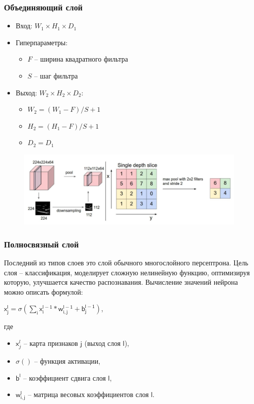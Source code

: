 \documentclass[unicode,9pt, pdf]{beamer}
\begin{document}
\begin{frame}
	\frametitle{Объединяющий слой}
		\begin{itemize}
			\item Вход: $W_{1} \times H_{1} \times D_{1}$
			\item Гиперпараметры: 
				\begin{itemize}
					\item $F$ -- ширина квадратного фильтра
					\item $S$ -- шаг фильтра
				\end{itemize}
			\item Выход: $W_{2} \times H_{2} \times D_{2}$:
				\begin{itemize}
					\item $W_{2} = (W_{1} - F)/S + 1$
					\item $H_{2} = (H_{1} - F)/S + 1$
					\item $D_{2} = D_{1}$
				\end{itemize}
		\end{itemize}
		\begin{figure}[h]
	\begin{center}
		\begin{minipage}[h]{0.92\linewidth}
			\includegraphics[width=1\linewidth]{cnn3.JPG}
		\end{minipage}
	\end{center}
\end{figure}
\end{frame}

\begin{frame}
	\frametitle{Полносвязный слой}
	Последний из типов слоев это слой обычного многослойного персептрона. Цель слоя – классификация, моделирует сложную нелинейную функцию, оптимизируя которую, улучшается качество распознавания. Вычисление значений нейрона можно описать формулой:
	\begin{center}
		$\mathsf{x}_{\mathsf{j}}^{\mathsf{l}} = \sigma(\sum \limits_{\mathsf{i}} \mathsf{x}_{\mathsf{i}}^{\mathsf{l-1}} * \mathsf{w}_{\mathsf{i,j}}^{\mathsf{l-1}}+\mathsf{b}_{\mathsf{j}}^{\mathsf{l-1}})$,
	\end{center}
	где
	\begin{itemize}
		\item $\mathsf{x}_{j}^{l}$ -- карта признаков $\mathsf{j}$ (выход слоя $\mathsf{l}$), 
		\item $\sigma()$ -- функция активации,
		\item $\mathsf{b}^{\mathsf{l}}$ -- коэффициент сдвига слоя $\mathsf{l}$,
		\item $\mathsf{w}_{\mathsf{i,j}}^{\mathsf{l}}$ -- матрица весовых коэффициентов слоя $\mathsf{l}$.
	\end{itemize}
\end{frame}
\end{document}
